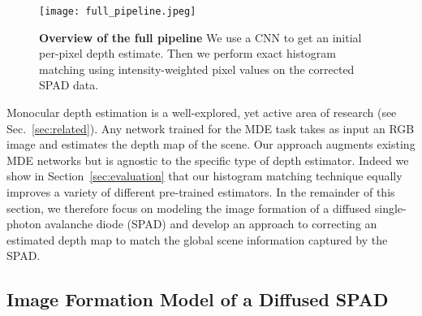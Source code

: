 \begin{figure}
  \centering
  \texttt{[image: full\_pipeline.jpeg]}
  \caption{\textbf{Overview of the full pipeline} We use a CNN to get an initial
  per-pixel depth estimate. Then we perform exact histogram matching using
  intensity-weighted pixel values on the corrected SPAD data.}
\end{figure}

Monocular depth estimation is a well-explored, yet active area of research (see Sec.~\ref{sec:related}). Any network trained for the MDE task takes as input an RGB image and estimates the depth map of the scene. Our approach augments existing MDE networks but is agnostic to the specific type of depth estimator. Indeed we show in Section~\ref{sec:evaluation} that our histogram matching technique equally improves a variety of different pre-trained estimators. In the remainder of this section, we therefore focus on modeling the image formation of a diffused single-photon avalanche diode (SPAD) and develop an approach to correcting an estimated depth map to match the global scene information captured by the SPAD.


\subsection{Image Formation Model of a Diffused SPAD}

